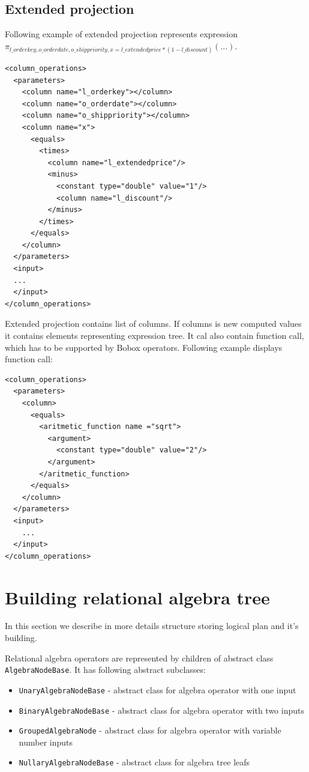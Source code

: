 \subsection{Extended projection}
Following example of extended projection represents expression \\ $\pi_{l\_orderkey,o\_orderdate,o\_shippriority,x=l\_extendedprice*(1-l\_discount)}(...)$.
\begin{lstlisting}
<column_operations>
  <parameters>
    <column name="l_orderkey"></column>
    <column name="o_orderdate"></column>
    <column name="o_shippriority"></column>
    <column name="x">
      <equals>
        <times>
          <column name="l_extendedprice"/>
          <minus>
            <constant type="double" value="1"/>
            <column name="l_discount"/>
          </minus>
        </times>
      </equals>
    </column>
  </parameters>
  <input>
  ...
  </input>
</column_operations>
\end{lstlisting}

Extended projection contains list of columns. If columns is new computed values it contains elements representing expression tree. It cal also contain function call, which has to be supported by Bobox operators. Following example displays function call:


\begin{lstlisting}
<column_operations>
  <parameters>
    <column>
      <equals>
        <aritmetic_function name ="sqrt">
          <argument>
            <constant type="double" value="2"/>
          </argument>
        </aritmetic_function>
      </equals>
    </column>
  </parameters>
  <input>
    ...
  </input>
</column_operations>
\end{lstlisting}
 
\section{Building relational algebra tree} 

In this section we describe in more details structure storing logical plan and it's building.

Relational algebra operators are represented by children of abstract class \texttt{AlgebraNodeBase}. It has following abstract subclasses:
\begin{itemize}

\item \texttt{UnaryAlgebraNodeBase} - abstract class for algebra operator with one input

\item \texttt{BinaryAlgebraNodeBase}  - abstract class for algebra operator with two inputs

\item \texttt{GroupedAlgebraNode} - abstract class for algebra operator with variable number inputs

\item \texttt{NullaryAlgebraNodeBase} -  abstract class for algebra tree leafs

\end{itemize}

